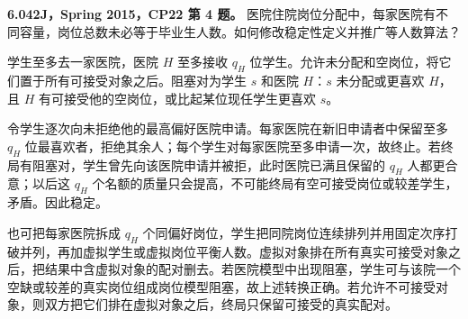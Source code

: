 \begin{exercise}\label{mit:6042-cp22-q4}
\textbf{6.042J，Spring 2015，CP22 第 4 题。}
医院住院岗位分配中，每家医院有不同容量，岗位总数未必等于毕业生人数。如何修改稳定性定义并推广等人数算法？
\end{exercise}
\begin{solution}
学生至多去一家医院，医院 $H$ 至多接收 $q_H$ 位学生。允许未分配和空岗位，将它们置于所有可接受对象之后。阻塞对为学生 $s$ 和医院 $H$：$s$ 未分配或更喜欢 $H$，且 $H$ 有可接受他的空岗位，或比起某位现任学生更喜欢 $s$。

令学生逐次向未拒绝他的最高偏好医院申请。每家医院在新旧申请者中保留至多 $q_H$ 位最喜欢者，拒绝其余人；每个学生对每家医院至多申请一次，故终止。若终局有阻塞对，学生曾先向该医院申请并被拒，此时医院已满且保留的 $q_H$ 人都更合意；以后这 $q_H$ 个名额的质量只会提高，不可能终局有空可接受岗位或较差学生，矛盾。因此稳定。

也可把每家医院拆成 $q_H$ 个同偏好岗位，学生把同院岗位连续排列并用固定次序打破并列，再加虚拟学生或虚拟岗位平衡人数。虚拟对象排在所有真实可接受对象之后，把结果中含虚拟对象的配对删去。若医院模型中出现阻塞，学生可与该院一个空缺或较差的真实岗位组成岗位模型阻塞，故上述转换正确。若允许不可接受对象，则双方把它们排在虚拟对象之后，终局只保留可接受的真实配对。
\end{solution}
